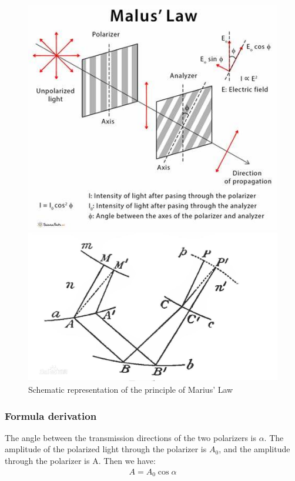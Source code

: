 \documentclass[UTF8]{article}
\begin{document}
	\begin{figure}[H]
	\begin{minipage}[t]{0.5\linewidth}
		\centering
		\includegraphics[clip,scale=0.31,trim={0 73 0 0}]{figure/fig6.jpg}
	\end{minipage}
	\begin{minipage}[t]{0.5\linewidth}
		\centering
		\includegraphics[clip,scale=0.18]{figure/fig7.jpg}
	\end{minipage}
\caption{Schematic representation of the principle of Marius' Law}
\label{figure.6}
\end{figure}
	
	\subsubsection{Formula derivation}
	The angle between the transmission directions of the two polarizers is $\alpha$. The amplitude of the polarized light through the polarizer is $A_{0}$, and the amplitude through the polarizer is A. Then we have:
   \begin{eqnarray}
        A=A_{0} \cos \alpha 
   \end{eqnarray}
\end{document}
